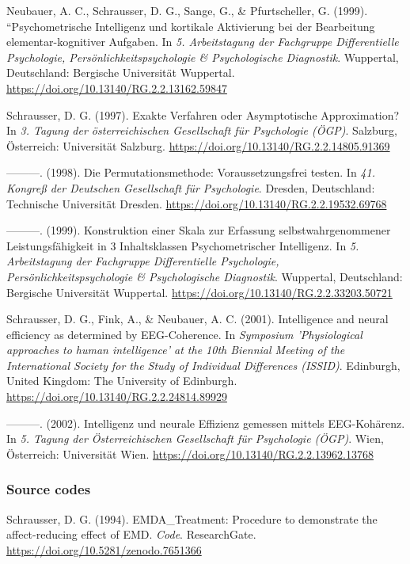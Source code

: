 \documentclass[
]{article}
\begin{document}
Neubauer, A. C., Schrausser, D. G., Sange, G., \& Pfurtscheller, G.
(1999). ``Psychometrische Intelligenz und kortikale Aktivierung bei der
Bearbeitung elementar-kognitiver Aufgaben. In \emph{5. Arbeitstagung der
Fachgruppe Differentielle Psychologie, Persönlichkeitspsychologie \&
Psychologische Diagnostik}. Wuppertal, Deutschland: Bergische
Universität Wuppertal. \url{https://doi.org/10.13140/RG.2.2.13162.59847}

Schrausser, D. G. (1997). Exakte Verfahren oder Asymptotische
Approximation? In \emph{3. Tagung der österreichischen Gesellschaft für
Psychologie (ÖGP)}. Salzburg, Österreich: Universität Salzburg.
\url{https://doi.org/10.13140/RG.2.2.14805.91369}

---------. (1998). Die Permutationsmethode: Voraussetzungsfrei testen.
In \emph{41. Kongreß der Deutschen Gesellschaft für Psychologie}.
Dresden, Deutschland: Technische Universität Dresden.
\url{https://doi.org/10.13140/RG.2.2.19532.69768}

---------. (1999). Konstruktion einer Skala zur Erfassung
selbstwahrgenommener Leistungsfähigkeit in 3 Inhaltsklassen
Psychometrischer Intelligenz. In \emph{5. Arbeitstagung der Fachgruppe
Differentielle Psychologie, Persönlichkeitspsychologie \& Psychologische
Diagnostik}. Wuppertal, Deutschland: Bergische Universität Wuppertal.
\url{https://doi.org/10.13140/RG.2.2.33203.50721}

Schrausser, D. G., Fink, A., \& Neubauer, A. C. (2001). Intelligence and
neural efficiency as determined by EEG-Coherence. In \emph{Symposium
'Physiological approaches to human intelligence' at the 10th Biennial
Meeting of the International Society for the Study of Individual
Differences (ISSID)}. Edinburgh, United Kingdom: The University of
Edinburgh. \url{https://doi.org/10.13140/RG.2.2.24814.89929}

---------. (2002). Intelligenz und neurale Effizienz gemessen mittels
EEG-Kohärenz. In \emph{5. Tagung der Österreichischen Gesellschaft für
Psychologie (ÖGP)}. Wien, Österreich: Universität Wien.
\url{https://doi.org/10.13140/RG.2.2.13962.13768}

\hypertarget{source-codes}{%
\subsubsection{Source codes}\label{source-codes}}

Schrausser, D. G. (1994). EMDA\_Treatment: Procedure to demonstrate the
affect-reducing effect of EMD. \emph{Code}. ResearchGate.
\url{https://doi.org/10.5281/zenodo.7651366}
\end{document}
